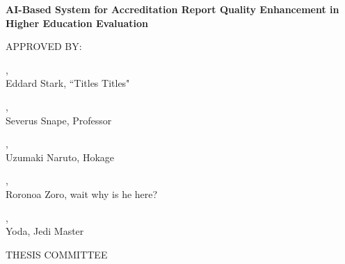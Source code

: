 \begin{center}

\Large
\textbf{AI-Based System for Accreditation Report Quality Enhancement in Higher Education Evaluation}


\vspace{3cm}

\large
APPROVED BY:\\
\vspace{1cm}

\underline{\hspace{5cm}},\\
Eddard Stark, ``Titles Titles"\\
\vspace{1cm}

\underline{\hspace{5cm}},\\
Severus Snape, Professor\\
\vspace{1cm}

\underline{\hspace{5cm}},\\
Uzumaki Naruto, Hokage\\
\vspace{1cm}

\underline{\hspace{5cm}},\\
Roronoa Zoro, wait why is he here?\\
\vspace{1cm}

\underline{\hspace{5cm}},\\
Yoda, Jedi Master\\


\vspace{3cm}

THESIS COMMITTEE
    
\end{center}







\pagebreak